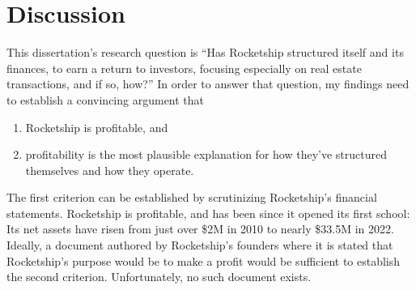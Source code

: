 
\chapter{Discussion}\label{ch:discussion}

\begin{comment}
  With sheer repetition, and in the absence of evidence, a myth about K-12 education has taken hold: American public schools are abject failures. Something must be done to reign in the rapacious unions who protect and coddle incompetent teachers. Something must be done about lazy administrators who block progress. Something must be done to give back to parents control over their children's education. And that something is charter schools.

  Rocketship is one of the most successful charter school chains in the United States, but their success is not in educating elementary school children. Case in point: In August 2023, the Fort Worth Star-Telegram reported that only 23\% of Rocketship's students met state standards in reading and language arts \parencite{Allen.Ruiz2023} compared to 53\% statewide \parencite{TexasEducationAgency2023}.

  Instead, Rocketship's success is in making money.
\end{comment}

This dissertation's research question is ``Has Rocketship structured itself and its finances, to earn a return to investors, focusing especially on real estate transactions, and if so, how?'' In order to answer that question, my findings need to establish a convincing argument that
\begin{enumerate}
  \item Rocketship is profitable, and
  \item profitability is the most plausible explanation for how they've structured themselves and how they operate.
\end{enumerate}

The first criterion can be established by scrutinizing Rocketship's financial statements. Rocketship is profitable, and has been since it opened its first school: Its net assets have risen from just over \$2M in 2010 to nearly \$33.5M in 2022. Ideally, a document authored by Rocketship's founders where it is stated that Rocketship's purpose would be to make a profit would be sufficient to establish the second criterion. Unfortunately, no such document exists.

